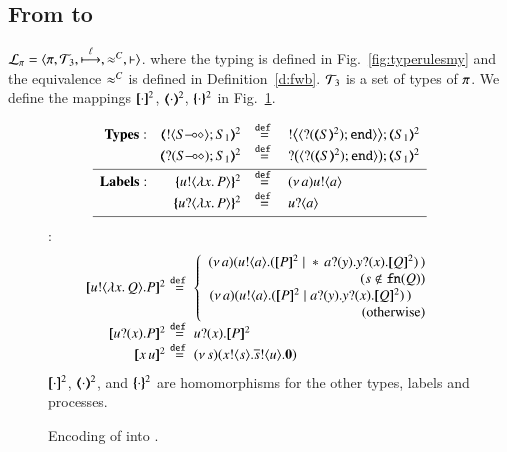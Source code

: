 \subsection{From \HO to \sessp}
\label{subsec:HO_to_sessp}

\begin{definition}
\label{d:enc:hopitopi}
$\tyl{L}_{\sessp}=\calc{\sessp}{{\cal{T}}_3}{\hby{\ell}}{\fwb}{\proves}$. 
where the typing is defined in 
Fig.~\ref{fig:typerulesmy} 
and the equivalence $\approx^C$ is defined in Definition~\ref{d:fwb}.
${\cal{T}}_3$ is a set of types of $\pi$.  
%
We define the mappings $[\!\![\cdot]\!\!]^{2}$, $(\!\!\langle\cdot\rangle\!\!)^{2}$, $\{\!\!\{\cdot\}\!\!\}^{2}$
in Fig.~\ref{f:enc:ho_to_sessp}. 
\end{definition}

\begin{figure}[t]
\[
\begin{array}{l}
	\begin{array}{rcl}
\noindent{\bf Types:}\quad 
		\tmap{\btout{\lhot{S}}S_1}{2} & \defeq & \bbtout{\chtype{\btinp{\tmap{S}{2}}\tinact}}\tmap{S_1}{2} \\
		\tmap{\btinp{\lhot{S}}S_1}{2} & \defeq & \bbtinp{\chtype{\btinp{\tmap{S}{2}}\tinact}}\tmap{S_1}{2} 
\\[1mm]
\hline
\noindent{\bf Labels:}\quad \quad 
		\mapa{\bactout{u}{\abs{ x}{P}} }^2  & \defeq & \news{a} \bactout{u}{a} \\
		\mapa{\bactinp{u}{\abs{ x}{P}} }^2 &  \defeq & \bactinp{u}{a}
\\[1mm]
\hline
\end{array}
\end{array}
\]
\hspace{4mm}{\bf Terms} :
\[
\begin{array}{rcll}
		\pmap{\bout{u}{\abs{x}{Q}} P}{2} &\!\!\!\! \defeq \!\!\!\!&  \left\{
		\begin{array}{r}
			\newsp{a}{\bout{u}{a} (\pmap{P}{2} \Par \repl{} \binp{a}{y} \binp{y}{x} \pmap{Q}{2})\,}\\
                  (s \notin \fn{Q}) \\
			\newsp{a}{\bout{u}{a} (\pmap{P}{2} \Par \binp{a}{y} \binp{y}{x} \pmap{Q}{2})\,}\quad\\
            \textrm{(otherwise)} %
		\end{array}
		\right.
		\\
\pmap{\binp{u}{x} P}{2} &\!\!\!\! \defeq \!\!\!\! &  \binp{u}{x} \pmap{P}{2}\\
\pmap{\appl{x}{u}}{2} & \!\!\!\! \defeq \!\!\!\! & \newsp{s}{\bout{x}{s} \bout{\dual{s}}{u} \inact}\\

	\end{array}
	\]
$[\!\![\cdot]\!\!]^2$,
$(\!\!\langle\cdot\rangle\!\!)^2$, 
and 
$\{\!\!\{\cdot\}\!\!\}^2$
are homomorphisms for the other types, labels and processes.   
	\caption{
Encoding of \HO into \sessp.
\label{f:enc:ho_to_sessp}
}
\end{figure}


